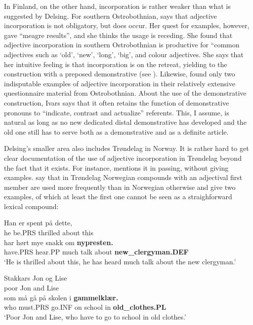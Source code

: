 In Finland, on the other hand, incorporation is rather weaker than what is suggested by Delsing. For southern Ostrobothnian, \citet{Ivars2005} says that adjective incorporation is not obligatory, but does occur. Her quest for examples, however, gave “meagre results”, and she thinks the usage is receding. She found that adjective incorporation in southern Ostrobothnian is productive for “common adjectives such as  ‘old’,  ‘new’,  ‘long’,  ‘big’, and colour adjectives. She says that her intuitive feeling is that incorporation is on the retreat, yielding to the construction with a preposed demonstrative (see ).  Likewise, \citet{ErikssonEtAl} found only two indisputable examples of adjective incorporation in their relatively extensive questionnaire material from Ostrobothnian. About the use of the demonstrative construction, Ivars says that it often retains the function of demonstrative pronouns to “indicate, contrast and actualize” referents. This, I assume, is natural as long as no new dedicated distal demonstrative has developed and the old one still has to serve both as a demonstrative and as a definite article. 

Delsing’s smaller area also includes Trøndelag in Norway. It is rather hard to get clear documentation of the use of adjective incorporation in Trøndelag beyond the fact that it exists. For instance, \citet[161]{Vangsnes2003} mentions it in passing, without giving examples. \citet[161]{FaarlundEtAl1997} say that in Trøndelag Norwegian compounds with an adjectival first member are used more frequently than in Norwegian otherwise and give two examples, of which at least the first one cannot be seen as a straighforward lexical compound: 

\ea\label{}
\gll Han  er  spent  på  dette,\\
he  be.PRS  thrilled  about  this\\
\gll har  hørt  mye  snakk  om  \textbf{nypresten.} \\
have.PRS  hear.PP  much  talk  about   \textbf{new\_clergyman.DEF} \\
\glt ‘He is thrilled about this, he has heard much talk about the new clergyman.’
\z

\ea\label{}
\gll Stakkars  Jon  og  Lise\\
poor  Jon  and  Lise\\
\gll som  må  gå  på  skolen  i  \textbf{gammelklær.}\\
who  must.PRS  go.INF  on  school  in  \textbf{old\_clothes.PL}\\
\glt ‘Poor Jon and Lise, who have to go to school in old clothes.’
\z

